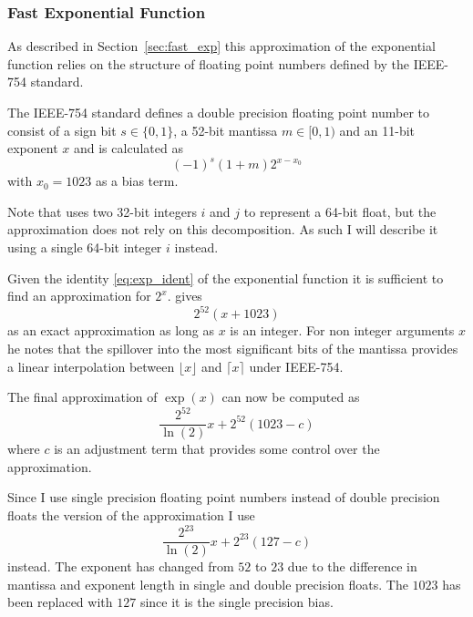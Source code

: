 \documentclass[a4paper, 11pt]{memoir}
\begin{document}
    \subsubsection{Fast Exponential Function}
    \label{sec:impl_fast_exp}
    As described in Section~\ref{sec:fast_exp} this approximation of the exponential function relies on the structure of
    floating point numbers defined by the IEEE-754 standard.

    The IEEE-754 standard defines a double precision floating point number to consist of a sign bit $s \in \{ 0, 1 \}$,
    a 52-bit mantissa $m \in [0, 1)$ and an 11-bit exponent $x$ and is calculated as
    \begin{equation}
        (-1)^s (1 + m) 2^{x - x_0}
        \label{eq:def_ieee754}
    \end{equation}
    with $x_0 = 1023$ as a bias term.

    Note that \citeauthor{fast_exp} uses two 32-bit integers $i$ and $j$ to represent a 64-bit float, but the
    approximation does not rely on this decomposition. As such I will describe it using a single 64-bit integer $i$ instead.

    Given the identity \eqref{eq:exp_ident} of the exponential function it is sufficient to find an approximation for
    $2^x$. \citeauthor{fast_exp} gives
    \begin{equation}
        2^{52}(x + 1023)
    \end{equation}
    as an exact approximation as long as $x$ is an integer. For non integer arguments $x$ he notes that the spillover into
    the most significant bits of the mantissa provides a linear interpolation between $\lfloor x \rfloor$ and $\lceil x
    \rceil$ under IEEE-754.

    The final approximation of $\exp{(x)}$ can now be computed as
    \begin{equation}
        \frac{2^{52}}{\ln{(2)}} x + 2^{52}(1023 - c)
    \end{equation}
    where $c$ is an adjustment term that provides some control over the approximation.

    Since I use single precision floating point numbers instead of double precision floats the version of the
    approximation I use
    \begin{equation}
        \frac{2^{23}}{\ln{(2)}}x + 2^{23}(127 - c)
    \end{equation}
    instead. The exponent has changed from $52$ to $23$ due to the difference in mantissa and exponent length in single and
    double precision floats. The $1023$ has been replaced with $127$ since it is the single precision bias.
\end{document}
